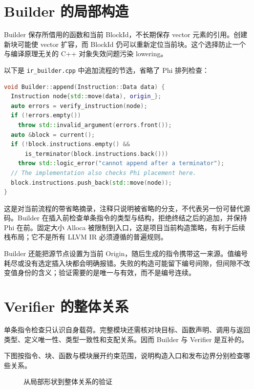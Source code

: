 \section{Builder 的局部构造}
Builder 保存所借用的函数和当前 BlockId，不长期保存 vector 元素的引用。创建新块可能使 vector 扩容，而 BlockId 仍可以重新定位当前块。这个选择防止一个与编译原理无关的 C++ 对象失效问题污染 lowering。

以下是 \texttt{ir\_builder.cpp} 中追加流程的节选，省略了 Phi 排列检查：
\begin{lstlisting}[language=C++,caption={当前 Builder 的局部保护}]
void Builder::append(Instruction::Data data) {
  Instruction node{std::move(data), origin_};
  auto errors = verify_instruction(node);
  if (!errors.empty())
    throw std::invalid_argument(errors.front());
  auto &block = current();
  if (!block.instructions.empty() &&
      is_terminator(block.instructions.back()))
    throw std::logic_error("cannot append after a terminator");
  // The implementation also checks Phi placement here.
  block.instructions.push_back(std::move(node));
}
\end{lstlisting}
这是对当前流程的带省略摘录，注释只说明被省略的分支，不代表另一份可替代源码。Builder 在插入前检查单条指令的类型与结构，拒绝终结之后的追加，并保持 Phi 在前。固定大小 Alloca 被限制到入口，这是项目当前构造策略，有利于后续栈布局；它不是所有 LLVM IR 必须遵循的普遍规则。

Builder 还能把源节点设置为当前 Origin，随后生成的指令携带这一来源。值编号耗尽或没有选定插入块都会明确报错。失败的构造可能留下编号间隙，但间隙不改变值身份的含义；验证需要的是唯一与有效，而不是编号连续。

\section{Verifier 的整体关系}
单条指令检查只认识自身载荷。完整模块还需核对块目标、函数声明、调用与返回类型、定义唯一性、类型一致性和支配关系。因而 Builder 与 Verifier 是互补的。

下图按指令、块、函数与模块展开约束范围，说明构造入口和发布边界分别检查哪些关系。
\begin{figure}[htbp]\centering
{}
\caption{从局部形状到整体关系的验证}
\end{figure}

